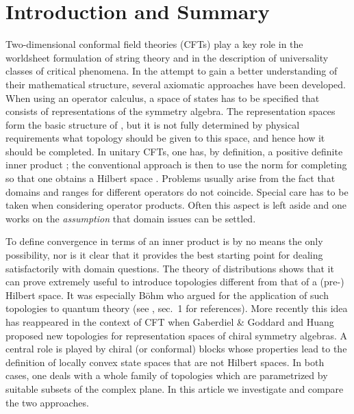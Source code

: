 \documentclass[a4paper,12pt,twoside]{article}
\renewcommand{\b}{\langle}
\renewcommand{\k}{\rangle}
\renewcommand{\c}[1]{{\cal #1}}
\renewcommand{\H}{\c{H}}
\begin{document}
\section{Introduction and Summary}
\label{Introduction_and_Summary}
Two-dimensional
conformal field theories (CFTs) play a key role in the worldsheet
formulation of string theory and in the description of universality classes of critical phenomena.
In the attempt to gain a better
understanding of their mathematical structure, several axiomatic approaches
have been developed.
When using an operator calculus,
a space of states \coordHE{} has to be specified that consists of
representations
of the symmetry algebra. The representation spaces form the basic structure of \coordHE{}, but
it is not fully determined by physical requirements
what topology should be given to this space, and hence how it should be completed.
In unitary CFTs, one has, by definition, a positive definite inner product
\myHighlight{$\b\;,\;\k$}\coordHE{}; the conventional approach
is then to use the norm
\myHighlight{$\|.\| = \sqrt{\b\;,\;\k}$}\coordHE{} for completing \coordHE{} so that one obtains a Hilbert
space \myHighlight{$\H$}\coordHE{}.
Problems usually arise from the fact that domains and ranges for different
operators do not coincide.
Special care has to be taken when considering
operator products. Often this aspect is left aside and
one works on
the {\it assumption} that domain issues can be settled.

To define convergence in terms of an inner product is by no means the only
possibility, nor is it clear that it provides the best starting point for
dealing satisfactorily with domain questions. The theory of distributions
shows that it can prove extremely useful to introduce topologies different
from that of a (pre-) Hilbert space. It was
especially B\"{o}hm who argued for the application of such topologies
to quantum theory (see \cite{Madrid}, sec.\ 1 for references). More recently
this idea has reappeared in the context of CFT when Gaberdiel \& Goddard
\cite{Gaberdiel}
and Huang \cite{Huang} proposed new topologies for
representation spaces of chiral symmetry algebras. A central role is played
by chiral (or conformal) blocks whose properties lead to the definition of
locally convex state spaces that are not Hilbert spaces.
In both cases, one deals with a whole family of topologies which are
parametrized by suitable subsets of the complex plane. In this article we
investigate and compare the two approaches.
\end{document}
